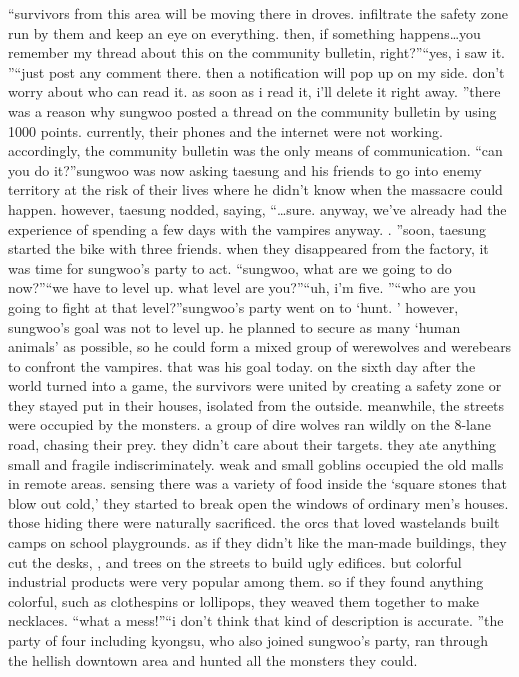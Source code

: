 “survivors from this area will be moving there in droves.
 infiltrate the safety zone run by them and keep an eye on everything.
 then, if something happens…you remember my thread about this on the community bulletin, right?”“yes, i saw it.
”“just post any comment there.
 then a notification will pop up on my side.
 don’t worry about who can read it.
 as soon as i read it, i’ll delete it right away.
”there was a reason why sungwoo posted a thread on the community bulletin by using 1000 points.
 currently, their phones and the internet were not working.
 accordingly, the community bulletin was the only means of communication.
“can you do it?”sungwoo was now asking taesung and his friends to go into enemy territory at the risk of their lives where he didn’t know when the massacre could happen.
however, taesung nodded, saying, “…sure.
 anyway, we’ve already had the experience of spending a few days with the vampires anyway.
.
”soon, taesung started the bike with three friends.
 when they disappeared from the factory, it was time for sungwoo’s party to act.
“sungwoo, what are we going to do now?”“we have to level up.
 what level are you?”“uh, i’m five.
”“who are you going to fight at that level?”sungwoo’s party went on to ‘hunt.
’ however, sungwoo’s goal was not to level up.
 he planned to secure as many ‘human animals’ as possible, so he could form a mixed group of werewolves and werebears to confront the vampires.
 that was his goal today.
on the sixth day after the world turned into a game, the survivors were united by creating a safety zone or they stayed put in their houses, isolated from the outside.
meanwhile, the streets were occupied by the monsters.
 a group of dire wolves ran wildly on the 8-lane road, chasing their prey.
 they didn’t care about their targets.
 they ate anything small and fragile indiscriminately.
weak and small goblins occupied the old malls in remote areas.
 sensing there was a variety of food inside the ‘square stones that blow out cold,’ they started to break open the windows of ordinary men’s houses.
 those hiding there were naturally sacrificed.
the orcs that loved wastelands built camps on school playgrounds.
 as if they didn’t like the man-made buildings, they cut the desks, , and trees on the streets to build ugly edifices.
but colorful industrial products were very popular among them.
 so if they found anything colorful, such as clothespins or lollipops, they weaved them together to make necklaces.
“what a mess!”“i don’t think that kind of description is accurate.
”the party of four including kyongsu, who also joined sungwoo’s party, ran through the hellish downtown area and hunted all the monsters they could.
